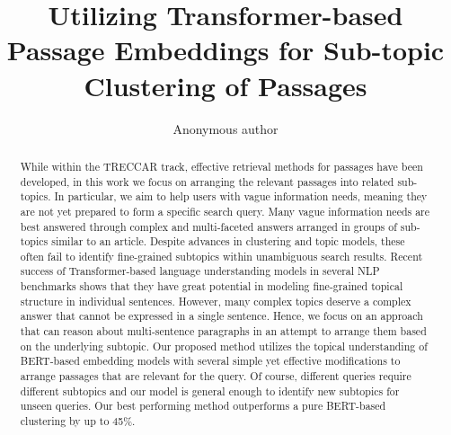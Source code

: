 \documentclass[sigconf,authordraft]{acmart}
\begin{document}
\title{Utilizing Transformer-based Passage Embeddings for Sub-topic Clustering of Passages}


\author{Anonymous author}

\renewcommand{\shortauthors}{}

\begin{abstract}
While within the TRECCAR track, effective retrieval methods for passages have been developed, in this work we focus on arranging the relevant passages into related sub-topics. In particular, we aim to help users with vague information needs, meaning they are not yet prepared to form a specific search query. Many vague information needs are best answered through complex and multi-faceted answers arranged in groups of sub-topics similar to an article. Despite advances in clustering and topic models, these often fail to identify fine-grained subtopics within unambiguous search results. Recent success of Transformer-based language understanding models in several NLP benchmarks shows that they have great potential in modeling fine-grained topical structure in individual sentences. However, many complex topics deserve a complex answer that cannot be expressed in a single sentence. Hence, we focus on an approach that can reason about multi-sentence paragraphs in an attempt to arrange them based on the underlying subtopic. Our proposed method utilizes the topical understanding of BERT-based embedding models with several simple yet effective modifications to arrange passages that are relevant for the query. Of course, different queries require different subtopics and our model is general enough to identify new subtopics for unseen queries. Our best performing method outperforms a pure BERT-based clustering by up to 45\%.
\end{abstract}
\end{document}
